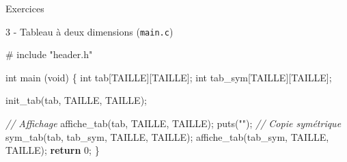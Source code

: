 \documentclass[
  10pt,
  french,
  ignorenonframetext,
  aspectratio=169,
]{beamer}
\newenvironment{Shaded}{}{}
\newcommand{\CommentTok}[1]{\textcolor[rgb]{0.38,0.63,0.69}{\textit{#1}}}
\newcommand{\ControlFlowTok}[1]{\textcolor[rgb]{0.00,0.44,0.13}{\textbf{#1}}}
\newcommand{\DataTypeTok}[1]{\textcolor[rgb]{0.56,0.13,0.00}{#1}}
\newcommand{\DecValTok}[1]{\textcolor[rgb]{0.25,0.63,0.44}{#1}}
\newcommand{\ImportTok}[1]{#1}
\newcommand{\NormalTok}[1]{#1}
\newcommand{\OperatorTok}[1]{\textcolor[rgb]{0.40,0.40,0.40}{#1}}
\newcommand{\PreprocessorTok}[1]{\textcolor[rgb]{0.74,0.48,0.00}{#1}}
\newcommand{\StringTok}[1]{\textcolor[rgb]{0.25,0.44,0.63}{#1}}
\begin{document}
\begin{frame}[fragile]{Exercices}
\protect\hypertarget{exercices-10}{}
\begin{block}{3 - Tableau à deux dimensions (\texttt{main.c})}
\protect\hypertarget{tableau-uxe0-deux-dimensions-main.c}{}
\begin{Shaded}
\begin{Highlighting}[]
\PreprocessorTok{\# include }\ImportTok{"header.h"}

\DataTypeTok{int}\NormalTok{ main }\OperatorTok{(}\DataTypeTok{void}\OperatorTok{)} \OperatorTok{\{}
    \DataTypeTok{int}\NormalTok{ tab}\OperatorTok{[}\NormalTok{TAILLE}\OperatorTok{][}\NormalTok{TAILLE}\OperatorTok{];}
    \DataTypeTok{int}\NormalTok{ tab\_sym}\OperatorTok{[}\NormalTok{TAILLE}\OperatorTok{][}\NormalTok{TAILLE}\OperatorTok{];}

\NormalTok{    init\_tab}\OperatorTok{(}\NormalTok{tab}\OperatorTok{,}\NormalTok{ TAILLE}\OperatorTok{,}\NormalTok{ TAILLE}\OperatorTok{);}

    \CommentTok{// Affichage}
\NormalTok{    affiche\_tab}\OperatorTok{(}\NormalTok{tab}\OperatorTok{,}\NormalTok{ TAILLE}\OperatorTok{,}\NormalTok{ TAILLE}\OperatorTok{);}
\NormalTok{    puts}\OperatorTok{(}\StringTok{""}\OperatorTok{);}
    \CommentTok{// Copie symétrique}
\NormalTok{    sym\_tab}\OperatorTok{(}\NormalTok{tab}\OperatorTok{,}\NormalTok{ tab\_sym}\OperatorTok{,}\NormalTok{ TAILLE}\OperatorTok{,}\NormalTok{ TAILLE}\OperatorTok{);}
\NormalTok{    affiche\_tab}\OperatorTok{(}\NormalTok{tab\_sym}\OperatorTok{,}\NormalTok{ TAILLE}\OperatorTok{,}\NormalTok{ TAILLE}\OperatorTok{);}
    \ControlFlowTok{return} \DecValTok{0}\OperatorTok{;}
\OperatorTok{\}}
\end{Highlighting}
\end{Shaded}
\end{block}
\end{frame}
\end{document}
